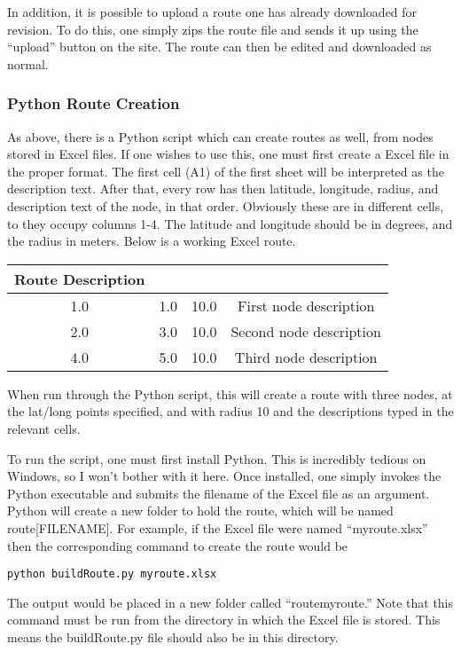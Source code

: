 In addition, it is possible to upload a route one has already downloaded for revision. To do this, one simply zips the route file and sends it up using the ``upload'' button on
the site. The route can then be edited and downloaded as normal.

\subsubsection{Python Route Creation}
As above, there is a Python script which can create routes as well, from nodes stored in Excel files. If one wishes to use this, one must first create a Excel file in the
proper format. The first cell (A1) of the first sheet will be interpreted as the description text. After that, every row has then latitude, longitude, radius, and description
text of the node, in that order. Obviously these are in different cells, to they occupy columns 1-4. The latitude and longitude should be in degrees, and the radius in meters.
Below is a working Excel route.\par
\begin{tabular}{|c|c|c|c|}
	\hline
	Route Description & & & \\ \hline
	1.0 & 1.0 & 10.0 & First node description \\ \hline
	2.0 & 3.0 & 10.0 & Second node description \\ \hline
	4.0 & 5.0 & 10.0 & Third node description \\ 
	\hline
\end{tabular}\par
When run through the Python script, this will create a route with three nodes, at the lat/long points specified, and with radius 10 and the descriptions typed in the relevant
cells.

To run the script, one must first install Python. This is incredibly tedious on Windows, so I won't bother with it here. Once installed, one simply invokes the Python
executable and submits the filename of the Excel file as an argument. Python will create a new folder to hold the route, which will be named route[FILENAME]. For example, if
the Excel file were named ``myroute.xlsx'' then the corresponding command to create the route would be
\begin{verbatim}
python buildRoute.py myroute.xlsx
\end{verbatim}
The output would be placed in a new folder called ``routemyroute.'' Note that this command must be run from the directory in which the Excel file is stored. This means the 
buildRoute.py file should also be in this directory.
